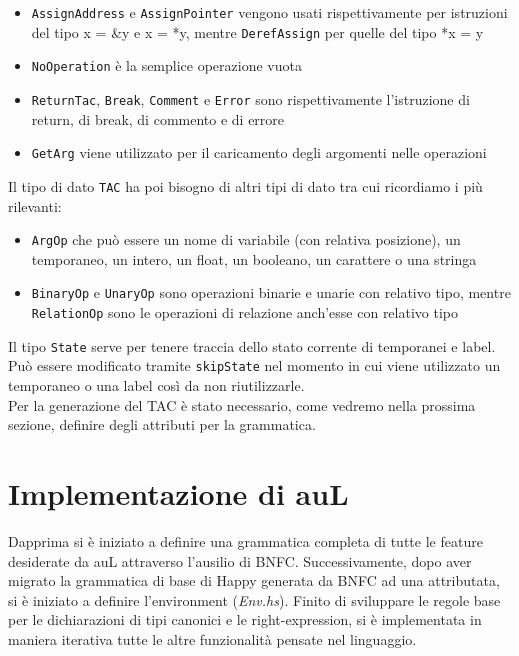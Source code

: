 \documentclass{article}
\begin{document}
\begin{itemize}
    \item \texttt{AssignAddress} e \texttt{AssignPointer} vengono usati rispettivamente per istruzioni del tipo  x = &y e x = *y, mentre \texttt{DerefAssign} per quelle del tipo *x = y
    \item \texttt{NoOperation} è la semplice operazione vuota
    \item \texttt{ReturnTac}, \texttt{Break}, \texttt{Comment} e \texttt{Error} sono rispettivamente l'istruzione di return, di break, di commento e di errore
    \item \texttt{GetArg} viene utilizzato per il caricamento degli argomenti nelle operazioni
\end{itemize}
Il tipo di dato \texttt{TAC} ha poi bisogno di altri tipi di dato tra cui ricordiamo i più rilevanti:
\begin{itemize}
    \item \texttt{ArgOp} che può essere un nome di variabile (con relativa posizione), un temporaneo, un intero, un float, un booleano, un carattere o una stringa
    \item \texttt{BinaryOp} e \texttt{UnaryOp} sono operazioni binarie e unarie con relativo tipo, mentre \texttt{RelationOp} sono le operazioni di relazione anch'esse con relativo tipo
\end{itemize}
Il tipo \texttt{State} serve per tenere traccia dello stato corrente di temporanei e label. Può essere modificato tramite \texttt{skipState} nel momento in cui viene utilizzato un temporaneo o una label così da non riutilizzarle.\\
Per la generazione del TAC è stato necessario, come vedremo nella prossima sezione, definire degli attributi per la grammatica.
\section{Implementazione di auL}
Dapprima si è iniziato a definire una grammatica completa di tutte le feature desiderate da auL attraverso l'ausilio di
BNFC. Successivamente, dopo aver migrato la grammatica di base di Happy generata da BNFC ad una attributata,
si è iniziato a definire l'environment (\textit{Env.hs}). Finito di sviluppare le regole base per le dichiarazioni 
di tipi canonici e le right-expression, si è implementata in maniera iterativa tutte le altre funzionalità pensate 
nel linguaggio.
\end{document}
